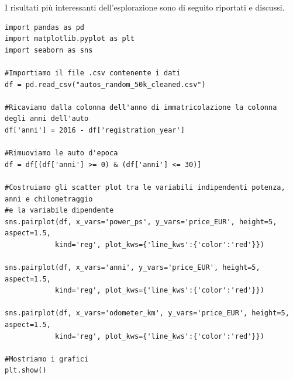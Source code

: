 I risultati più interessanti dell'esplorazione sono di seguito riportati e discussi.
\bigskip

\lstset{language=Python}
\lstset{frame=lines}
\lstset{basicstyle=\footnotesize}
\lstset{columns=fullflexible}
\begin{lstlisting}
import pandas as pd
import matplotlib.pyplot as plt
import seaborn as sns

#Importiamo il file .csv contenente i dati
df = pd.read_csv("autos_random_50k_cleaned.csv")

#Ricaviamo dalla colonna dell'anno di immatricolazione la colonna degli anni dell'auto
df['anni'] = 2016 - df['registration_year']

#Rimuoviamo le auto d'epoca
df = df[(df['anni'] >= 0) & (df['anni'] <= 30)]

#Costruiamo gli scatter plot tra le variabili indipendenti potenza, anni e chilometraggio
#e la variabile dipendente
sns.pairplot(df, x_vars='power_ps', y_vars='price_EUR', height=5, aspect=1.5, 
            kind='reg', plot_kws={'line_kws':{'color':'red'}})

sns.pairplot(df, x_vars='anni', y_vars='price_EUR', height=5, aspect=1.5, 
            kind='reg', plot_kws={'line_kws':{'color':'red'}})

sns.pairplot(df, x_vars='odometer_km', y_vars='price_EUR', height=5, aspect=1.5, 
            kind='reg', plot_kws={'line_kws':{'color':'red'}})

#Mostriamo i grafici
plt.show()
\end{lstlisting}

